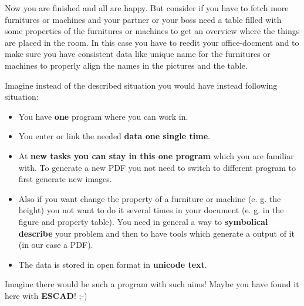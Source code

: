 \documentclass[a4paper, 12pt, openany]{scrbook}
\begin{document}

Now you are finished and all are happy. But consider if you have to fetch more furnitures or machines and your partner or your boss need a table filled with some properties of the furnitures or machines to get an overview where the things are placed in the room. In this case you have to reedit your office-docment and to make sure you have consistent data like unique name for the furnitures or machines to properly align the names in the pictures and the table.

Imagine instead of the described situation you would have instead following situation:
\begin{itemize}
\item You have \textbf{one} program where you can work in.
\item You enter or link the needed \textbf{data one single time}.
\item At \textbf{new tasks you can stay in this one program} which you are familiar with. To generate a new PDF you not need to switch to different program to first generate new images.
\item Also if you want change the property of a furniture or machine (e. g. the height) you not want to do it several times in your document (e. g. in the figure and property table). You need in general a way to \textbf{symbolical describe} your problem and then to have tools which generate a output of it (in our case a PDF).
\item The data is stored in open format in \textbf{unicode text}.
\end{itemize}
  
Imagine there would be such a program with such aims! Maybe you have found it here with \textbf{ESCAD}! ;-)
\end{document}

